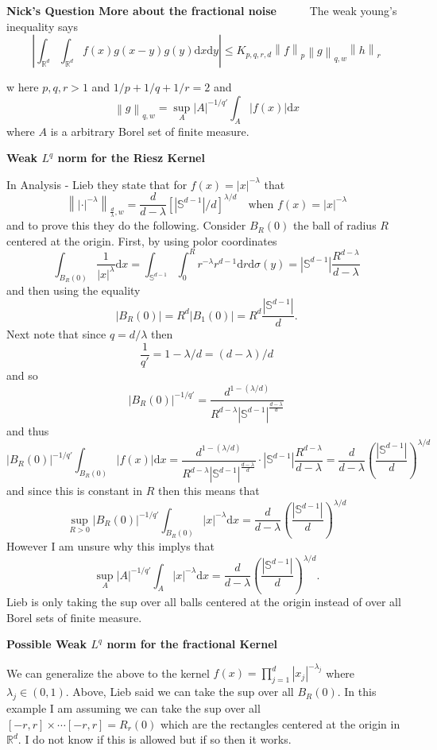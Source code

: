 \documentclass[a4paper,11pt]{article}
\numberwithin{equation}{section}
\theoremstyle{plain}
\theoremstyle{definition}
\newcommand{\ud}{\ensuremath{\mathrm{d} }}
\newcommand{\Norm}[1]{\left\|  #1   \right\|}
\newcommand{\R}{\mathbb{R}}
\newcounter{NQ}
\newenvironment{NickQuestion}[1][] %
{\refstepcounter{NQ}
	\begin{mdframed}[backgroundcolor=lightgray]\textbf{Nick's Question \theNQ \: #1~~}~~~\noindent}%
	{\end{mdframed}}
\numberwithin{NQ}{section}
\numberwithin{LQ}{section}
\numberwithin{ZQ}{section}
\begin{document}
	\begin{NickQuestion}[More about the fractional noise]
		The weak young's inequality says
		\[
		\left|	\int_{\R^d}\int_{\R^d}f(x)g(x-y)g(y) \ud x \ud y \right| \le K_{p,q,r,d} \Norm{f}_p\Norm{g}_{q,w}\Norm{h}_r
		\]

		w here $p,q,r >1$ and $1/p + 1/q + 1/r =2$ and
		\[
		\Norm{g}_{q,w} = \sup_{A} |A|^{-1/q'} \int_A |f(x)| \ud x
		\]
		where $A$ is a arbitrary Borel set of finite measure.

		\textbf{Weak $L^q$ norm for the Riesz Kernel}

		In Analysis - Lieb they state that for $f(x) = |x|^{-\lambda}$ that
		\[
		\Norm{|\cdot|^{-\lambda}}_{\frac{d}{\lambda},w} = \frac{d}{d-\lambda}\left[ |\mathbb{S}^{d-1}|/d \right]^{\lambda/d} \quad \text{when } f(x) = |x|^{-\lambda}
		\]
		and to prove this they do the following. Consider $B_R(0)$ the ball of radius $R$ centered at the origin. First, by using polor coordinates
		\[
		\int_{B_R(0)} \frac{1}{|x|^\lambda} \ud x = \int_{\mathbb{S}^{d-1}}\int_0^R r^{-\lambda}r^{d-1} \ud r \ud \sigma(y) = |\mathbb{S}^{d-1}| \frac{R^{d-\lambda}}{d-\lambda}
		\]
		and then using the equality
		\[
		|B_R(0)| = R^d|B_1(0)| = R^d \frac{|\mathbb{S}^{d-1}|}{d}.
		\]
		Next note that since $q = d/\lambda$ then
		\[
		\frac{1}{q'} = 1 - \lambda / d = (d- \lambda)/d
		\]
		and so
		\[
		|B_R(0)|^{-1/q'} = \frac{d^{1-(\lambda/d)}}{ R^{d-\lambda} |\mathbb{S}^{d-1}|^{\frac{d-\lambda}{d}} }
		\]
		and thus
		\[
		|B_R(0)|^{-1/q'} \int_{B_R(0)} |f(x)| \ud x = \frac{d^{1-(\lambda/d)}}{ R^{d-\lambda} |\mathbb{S}^{d-1}|^{\frac{d-\lambda}{d}} } \cdot |\mathbb{S}^{d-1}| \frac{R^{d-\lambda}}{d-\lambda} = \frac{d}{d-\lambda} \left( \frac{ |\mathbb{S}^{d-1}| }{d} \right)^{\lambda / d}
		\]
		and since this is constant in $R$ then this means that
		\[
		\sup_{R>0} |B_R(0)|^{-1/q'} \int_{B_R(0)} |x|^{-\lambda} \ud x = \frac{d}{d-\lambda} \left( \frac{ |\mathbb{S}^{d-1}| }{d} \right)^{\lambda / d}
		\]
		However I am unsure why this implys that
		\[
		\sup_{A} |A|^{-1/q'} \int_{A} |x|^{-\lambda} \ud x = \frac{d}{d-\lambda} \left( \frac{ |\mathbb{S}^{d-1}| }{d} \right)^{\lambda / d}.
		\]
		Lieb is only taking the sup over all balls centered at the origin instead of over all Borel sets of finite measure.

		\textbf{Possible Weak $L^q$ norm for the fractional Kernel}

		We can generalize the above to the kernel $f(x) = \prod_{j = 1}^d |x_j|^{-\lambda_j}$ where $\lambda_j \in (0,1)$. Above, Lieb said we can take the sup over all $B_R(0)$. In this example I am assuming we can take the sup over all $[-r,r] \times \cdots [-r,r] = R_r(0)$ which are the rectangles centered at the origin in $\R^d$. I do not know if this is allowed but if so then it works.


\end{NickQuestion}
\end{document}
